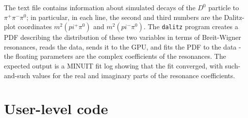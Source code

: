 \documentclass[12pt,pdflatex]{article}
\begin{document}
The text file contains information about simulated decays of the
$D^0$ particle to $\pi^+\pi^-\pi^0$; in particular, in each line, the second and
third numbers are the Dalitz-plot coordinates $m^2(pi^+\pi^0)$ and
$m^2(pi^-\pi^0)$. The \texttt{dalitz} program creates a PDF describing the distribution of
these two variables in terms of Breit-Wigner resonances, 
reads the data, sends it to the GPU, and fits the PDF to the data
 - the floating parameters are the complex coefficients of the resonances.
The expected output is a MINUIT fit log showing that the fit
converged, with such-and-such values for the real and imaginary
parts of the resonance coefficients. 

\section{User-level code}
\label{sec:usercode}
\end{document}
